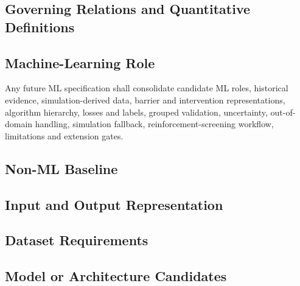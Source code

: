 \subsection{Governing Relations and Quantitative Definitions}
\label{sec:res-ml-spec-governing-relations}

%

\subsection{Machine-Learning Role}
\label{sec:res-ml-spec-machine-learning-role}

Any future ML specification shall consolidate candidate ML roles,
historical evidence, simulation-derived data, barrier and intervention
representations, algorithm hierarchy, losses and labels, grouped
validation, uncertainty, out-of-domain handling, simulation fallback,
reinforcement-screening workflow, limitations and extension gates.

\subsection{Non-ML Baseline}
\label{sec:res-ml-spec-non-ml-baseline}


\subsection{Input and Output Representation}
\label{sec:res-ml-spec-input-output-representation}


\subsection{Dataset Requirements}
\label{sec:res-ml-spec-dataset-requirements}


\subsection{Model or Architecture Candidates}
\label{sec:res-ml-spec-model-architecture-candidates}

